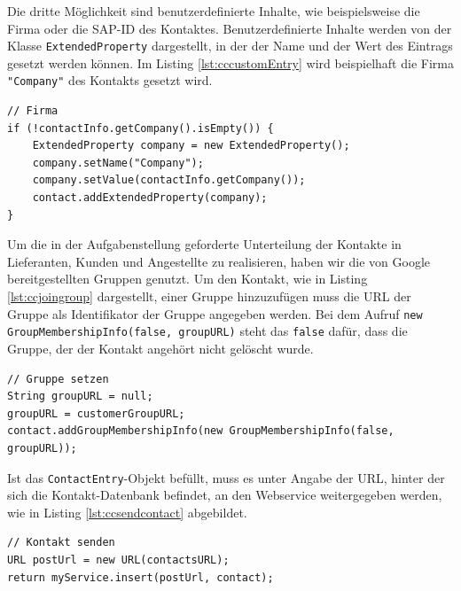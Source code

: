 Die dritte Möglichkeit sind benutzerdefinierte Inhalte, wie beispielsweise die Firma oder die
 SAP-ID des Kontaktes.
Benutzerdefinierte Inhalte werden von der Klasse \lstinline{ExtendedProperty} dargestellt, in der
 der Name und der Wert des Eintrags gesetzt werden können.
Im Listing \ref{lst:cccustomEntry} wird beispielhaft die Firma \lstinline{"Company"} des Kontakts
 gesetzt wird.

\begin{lstlisting}[float=h!t]
// Firma
if (!contactInfo.getCompany().isEmpty()) {
	ExtendedProperty company = new ExtendedProperty();
	company.setName("Company");
	company.setValue(contactInfo.getCompany());
	contact.addExtendedProperty(company);
}
\end{lstlisting}

Um die in der Aufgabenstellung geforderte Unterteilung der Kontakte in Lieferanten, Kunden und
 Angestellte zu realisieren, haben wir die von Google bereitgestellten Gruppen genutzt.
Um den Kontakt, wie in Listing \ref{lst:ccjoingroup} dargestellt, einer Gruppe hinzuzufügen muss
 die URL der Gruppe als Identifikator der Gruppe angegeben werden.
Bei dem Aufruf \lstinline{new GroupMembershipInfo(false, groupURL)} steht das \lstinline{false}
 dafür, dass die Gruppe, der der Kontakt angehört nicht gelöscht wurde.

\begin{lstlisting}[float=h!t]
// Gruppe setzen
String groupURL = null;
groupURL = customerGroupURL;
contact.addGroupMembershipInfo(new GroupMembershipInfo(false, groupURL));
\end{lstlisting}

Ist das \lstinline{ContactEntry}-Objekt befüllt, muss es unter Angabe der URL, hinter der sich die
 Kontakt-Datenbank befindet, an den Webservice weitergegeben werden, wie in Listing
 \ref{lst:ccsendcontact} abgebildet.

\begin{lstlisting}[float=h!t]
// Kontakt senden		
URL postUrl = new URL(contactsURL);
return myService.insert(postUrl, contact);
\end{lstlisting}
\FloatBarrier
